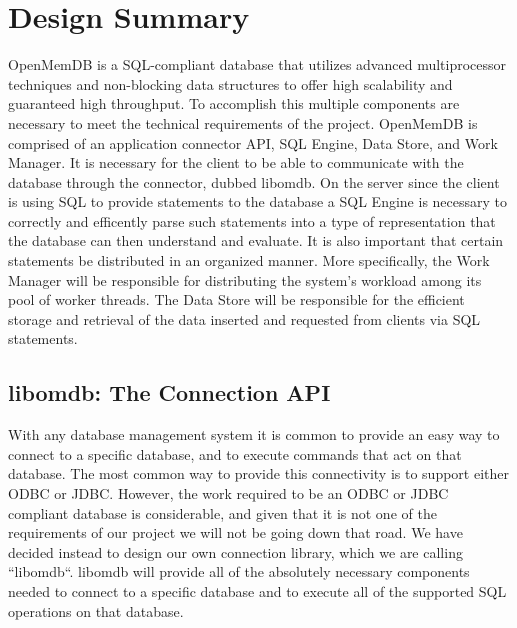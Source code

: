 \documentclass[letterpaper, 11pt]{article}
\begin{document}
\section{Design Summary}
OpenMemDB is a SQL-compliant database that utilizes advanced multiprocessor techniques and non-blocking
data structures to offer high scalability and guaranteed high throughput. To accomplish this
multiple components are necessary to meet the technical requirements of the project. OpenMemDB is 
comprised of an application connector API, SQL Engine, Data Store, and Work Manager.
It is necessary for the client to be able to communicate with the database through the connector, 
dubbed libomdb. On the server since the client is using SQL to provide
statements to the database a SQL Engine is necessary to correctly and efficently parse
such statements into a type of representation that the database can then understand and evaluate.
It is also important that certain statements be distributed in an organized manner. More specifically, 
the Work Manager will be responsible for distributing the system's workload among its pool of worker threads. 
The Data Store will be responsible for the efficient storage and retrieval of the data inserted and requested 
from clients via SQL statements.
\par\vspace{\baselineskip}

  \subsection{libomdb: The Connection API}
  With any database management system it is common to provide an easy way to connect
  to a specific database, and to execute commands that act on that database. The most common
  way to provide this connectivity is to support either ODBC or JDBC. However, the work
  required to be an ODBC or JDBC compliant database is considerable, and given that it is
  not one of the requirements of our project we will not be going down that road. We have
  decided instead to design our own connection library, which we are calling
  ``libomdb``. libomdb will provide all of the absolutely necessary components needed to
  connect to a specific database and to execute all of the supported SQL operations on
  that database.
  \par\vspace{\baselineskip}
  
\end{document}
